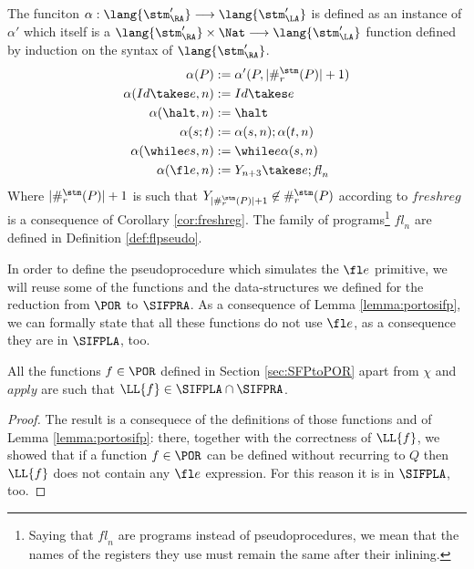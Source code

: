 \begin{defn}
  \label{def:alpha}
  The funciton $\alpha: \lang{\stm_\RA'}
    \longrightarrow
    \lang{\stm_\LA'}$ is defined as an instance of $\alpha'$ which itself is a
    $\lang{\stm_\RA'}\times \Nat
      \longrightarrow
      \lang{\stm_\LA'}$ function defined by
     induction on the syntax of $\lang{\stm_\RA'}$.
  \begin{align*}
    \alpha(P)&:=\alpha'(P, |\#_r^\stm(P)|+1)\\
    \alpha(Id \takes e, n) &:= Id \takes e\\
    \alpha(\halt, n) &:= \halt\\
    \alpha(s;t) &:= \alpha(s, n);\alpha(t, n)\\
    \alpha(\while e s, n) &:= \while e {\alpha(s, n)}\\
    \alpha(\fl e, n) &:=  Y_{n+3}\takes e; \mathit{fl}_n
  \end{align*}
  Where $|\#_r^\stm(P)|+1$ is such that $Y_{|\#_r^\stm(P)|+1} \not \in \#_r^\stm(P)$
  according to $\mathit{freshreg}$ is a consequence of Corollary \ref{cor:freshreg}.
  The family of programs\footnote{Saying that $\mathit{fl}_n$ are programs instead of pseudoprocedures, we mean that the names of the registers they use must remain the same after their inlining.} $\mathit{fl}_n$ are defined in Definition
  \ref{def:flpseudo}.
\end{defn}

In order to define the pseudoprocedure which simulates the $\fl e $ primitive,
we will reuse some of the functions and the data-structures we defined for
the reduction from $\POR$ to $\SIFPRA$. As a consequence of
Lemma \ref{lemma:portosifp}, we can formally state that all
these functions do not use $\fl e$, as a consequence they are in $\SIFPLA$, too.

\begin{cor}
  \label{cor:trivportosifpla}
  All the functions $f \in \POR$ defined in Section \ref{sec:SFPtoPOR} apart from
  $\chi$ and $\mathit{apply}$ are such that $\LL{f}\in \SIFPLA\cap \SIFPRA$.
\end{cor}
\begin{proof}
  The result is a consequece of the definitions of those functions and of Lemma
  \ref{lemma:portosifp}: there, together with the correctness of $\LL{f}$, we showed
  that if a function $f \in \POR$ can be defined without recurring to $Q$ then
  $\LL{f}$ does not contain any $\fl e$ expression. For this reason it is in $\SIFPLA$, too.
\end{proof}


